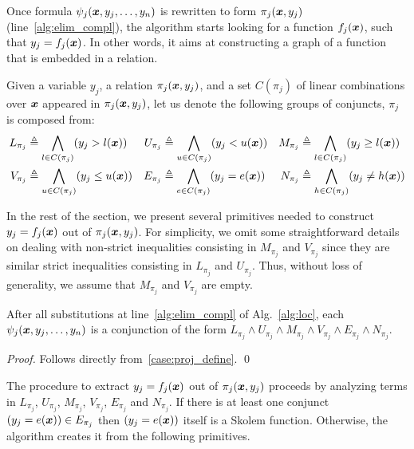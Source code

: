 Once formula $\psi_j(\vx,y_{j},\ldots,y_{n})$ is rewritten to form $\pi_j(\vx,y_{j})$ (line~\ref{alg:elim_compl}), the algorithm starts looking for a function $f_j(\vx)$, such that $y_j = f_j(\vx)$.
In other words, it aims at constructing a graph of a function that is embedded in a relation.

\begin{definition}
Given a variable $y_j$, a relation $\pi_j(\vx,y_{j})$, and a set $C({\pi_j})$ of linear combinations over $\vx$ appeared in $\pi_j(\vx,y_{j})$, let us denote the following groups of conjuncts, $\pi_j$ is composed from:
\begin{align*}
L_{\pi_j} &\triangleq \Land_{l \in C({\pi_j})}(y_j > l(\vx)) &
U_{\pi_j} &\triangleq \Land_{u \in C({\pi_j})}(y_j < u(\vx)) &  
M_{\pi_j} &\triangleq \Land_{l \in C({\pi_j})}(y_j \ge l(\vx)) \\
V_{\pi_j} &\triangleq \Land_{u \in C({\pi_j})}(y_j \le u(\vx))  &
E_{\pi_j} &\triangleq \Land_{e \in C({\pi_j})}(y_j = e(\vx))  &
N_{\pi_j} &\triangleq \Land_{h \in C({\pi_j})}(y_j \neq h(\vx))  
\end{align*}
\end{definition}

In the rest of the section, we present several primitives needed to construct $y_j = f_j(\vx)$ out of $\pi_j(\vx,y_{j})$.
For simplicity, we omit some straightforward details on dealing with
non-strict inequalities consisting in $M_{\pi_j}$ and $V_{\pi_j}$ since
they are similar strict inequalities consisting in $L_{\pi_j}$ and $U_{\pi_j}$.
Thus,  without loss of generality, we assume that $M_{\pi_j}$ and $V_{\pi_j}$ are empty.


\begin{lemma}
After all substitutions at line~\ref{alg:elim_compl} of Alg.~\ref{alg:loc}, each $\psi_j(\vx,y_{j},\ldots,y_{n})$ is a conjunction of the form
$L_{\pi_j} \land U_{\pi_j} \land M_{\pi_j} \land V_{\pi_j} \land E_{\pi_j} \land N_{\pi_j}$.
\end{lemma}
\begin{proof}
Follows directly from~\eqref{case:proj_define}.
\qed
\end{proof}

The procedure to extract $y_j = f_j(\vx)$ out of $\pi_j(\vx,y_{j})$ proceeds by analyzing terms in $L_{\pi_j}$, $U_{\pi_j}$, $M_{\pi_j}$, $V_{\pi_j}$, $E_{\pi_j}$ and $N_{\pi_j}$.
If there is at least one conjunct $(y_j = e(\vx)) \in E_{\pi_j}$ then $(y_j = e(\vx))$ itself is a Skolem function.
Otherwise, the algorithm creates it from the following primitives.

